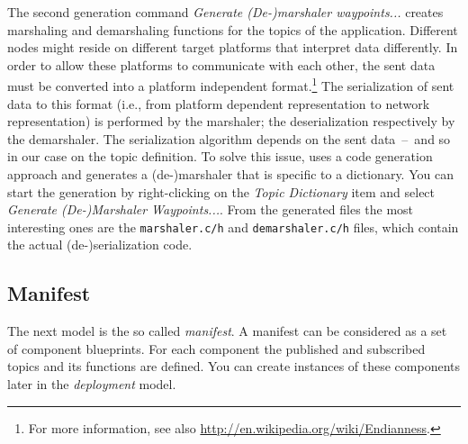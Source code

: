 The second generation command \emph{Generate (De-)marshaler waypoints...} creates marshaling and demarshaling functions for the topics of the application.
Different \xme nodes might reside on different target platforms that interpret data differently.
In order to allow these platforms to communicate with each other, the sent data must be converted into a platform independent format.\footnote{%
	For more information, see also \url{http://en.wikipedia.org/wiki/Endianness}.
}
%
The serialization of sent data to this format (i.e., from platform dependent representation to network representation)
is performed by the marshaler; the deserialization respectively by the demarshaler.
The serialization algorithm depends on the sent data~--~and so in our case on the topic definition.
To solve this issue, \xme uses a code generation approach and generates a (de-)marshaler that is specific to a dictionary.
You can start the generation by right-clicking on the \emph{Topic Dictionary} item and select \emph{Generate (De-)Marshaler Waypoints...}.
From the generated files the most interesting ones are the \verb|marshaler.c/h| and \verb|demarshaler.c/h| files, which contain the actual (de-)serialization code.

\subsection{Manifest}

The next model is the so called \emph{manifest}.
A manifest can be considered as a set of component blueprints.
For each component the published and subscribed topics and its functions are defined.
You can create instances of these components later in the \emph{deployment} model.

